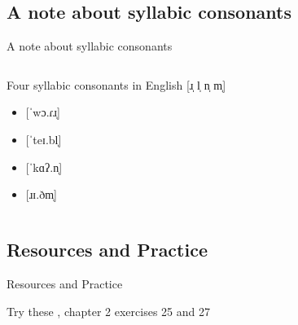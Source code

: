 \documentclass{beamer}
\newcommand{\subonesix}{A note about syllabic consonants}
\newcommand{\suboneseven}{Resources and Practice}
\begin{document}
    \subsection{\subonesix}
      \begin{frame}{\subonesix}
        \begin{columns}
            \begin{minipage}[c][0.6\textheight]{\linewidth}
              \begin{block}{Four syllabic consonants in English}
                [ɹ̩ l̩ n̩ m̩]
                \begin{itemize}
                  \item {[}ˈwɔ.ɾɹ̩]
                  \item {[}ˈteɪ.bl̩]
                  \item {[}ˈkɑʔ.n̩]
                  \item {[}ɹɪ.ðm̩]
                \end{itemize}
              \end{block}
            \end{minipage}
        \end{columns}
      \end{frame}

    \subsection{\suboneseven}
      \begin{frame}{\suboneseven}
        \begin{block}{}
          
        \end{block}
        \begin{block}{Try these}
          \textcite{dawson_language_2016}, chapter 2 exercises 25 and 27
        \end{block}
      \end{frame}
\end{document}
